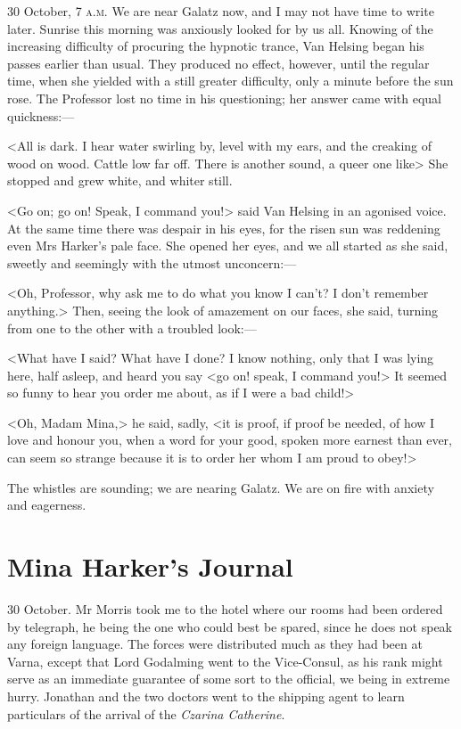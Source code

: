 \begin{diary}{30 October, 7 \textsc{a.m.}}
We are near Galatz now, and I may not have time to write later. Sunrise this morning was anxiously looked for by us all. Knowing of the increasing difficulty of procuring the hypnotic trance, Van Helsing began his passes earlier than usual. They produced no effect, however, until the regular time, when she yielded with a still greater difficulty, only a minute before the sun rose. The Professor lost no time in his questioning; her answer came with equal quickness:—

<All is dark. I hear water swirling by, level with my ears, and the creaking of wood on wood. Cattle low far off. There is another sound, a queer one like\longdash> She stopped and grew white, and whiter still.

<Go on; go on! Speak, I command you!> said Van Helsing in an agonised voice. At the same time there was despair in his eyes, for the risen sun was reddening even Mrs Harker's pale face. She opened her eyes, and we all started as she said, sweetly and seemingly with the utmost unconcern:—

<Oh, Professor, why ask me to do what you know I can't? I don't remember anything.> Then, seeing the look of amazement on our faces, she said, turning from one to the other with a troubled look:—

<What have I said? What have I done? I know nothing, only that I was lying here, half asleep, and heard you say <go on! speak, I command you!> It seemed so funny to hear you order me about, as if I were a bad child!>

<Oh, Madam Mina,> he said, sadly, <it is proof, if proof be needed, of how I love and honour you, when a word for your good, spoken more earnest than ever, can seem so strange because it is to order her whom I am proud to obey!>

The whistles are sounding; we are nearing Galatz. We are on fire with anxiety and eagerness.
\end{diary}

\section{Mina Harker's Journal}

\begin{diary}{30 October.}
Mr Morris took me to the hotel where our rooms had been ordered by telegraph, he being the one who could best be spared, since he does not speak any foreign language. The forces were distributed much as they had been at Varna, except that Lord Godalming went to the Vice-Consul, as his rank might serve as an immediate guarantee of some sort to the official, we being in extreme hurry. Jonathan and the two doctors went to the shipping agent to learn particulars of the arrival of the \textit{Czarina Catherine}.
\end{diary}

